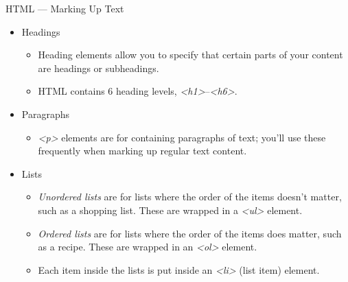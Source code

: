 \documentclass[aspectratio=169]{beamer}
\begin{document}
\begin{darkframes}
    \begin{frame}{HTML — Marking Up Text}
        \begin{itemize}
            \item Headings
            \begin{itemize}
                \item Heading elements allow you to specify that certain parts of your content are headings or subheadings.
                \item HTML contains 6 heading levels, \textit{<h1>}–\textit{<h6>}.
            \end{itemize}
            \item Paragraphs
            \begin{itemize}
                \item \textit{<p>} elements are for containing paragraphs of text; you'll use these frequently when marking up regular text content.
            \end{itemize}
            \item Lists
            \begin{itemize}
                \item \textit{Unordered lists} are for lists where the order of the items doesn't matter, such as a shopping list. These are wrapped in a \textit{<ul>} element.
                \item \textit{Ordered lists} are for lists where the order of the items does matter, such as a recipe. These are wrapped in an \textit{<ol>} element.
                \item Each item inside the lists is put inside an \textit{<li>} (list item) element.
            \end{itemize}
        \end{itemize}
    \end{frame}
    
    

\end{darkframes}
\end{document}
